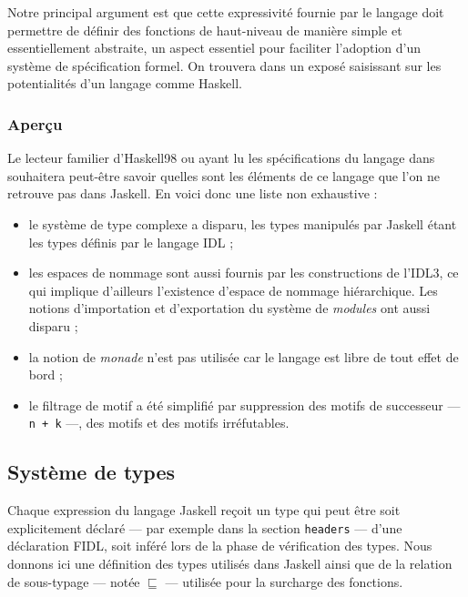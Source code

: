 Notre principal argument est que cette expressivit\'e fournie par le
langage doit permettre de d\'efinir des fonctions de haut-niveau de
mani\`ere simple et essentiellement abstraite, un aspect essentiel pour
faciliter l'adoption d'un syst\`eme de sp\'ecification formel. On trouvera
dans \cite{finfunc} un expos\'e saisissant sur les potentialit\'es d'un
langage comme \textsf{Haskell}.

\subsubsection{Aper\c{c}u}

Le lecteur familier d'\textsf{Haskell98} ou ayant lu les
sp\'ecifications du langage dans \cite{h98report} souhaitera peut-\^etre
savoir quelles sont les \'el\'ements de ce langage que l'on ne retrouve
pas dans \textsf{Jaskell}. En voici donc une liste non exhaustive :
\begin{itemize}
  \item le syst\`eme de type complexe a disparu, les types manipul\'es par
  \textsf{Jaskell} \'etant les types d\'efinis par le langage \textsf{IDL}
  ;
\item les espaces de nommage sont aussi fournis par les constructions
  de l'\textsf{IDL3}, ce qui implique d'ailleurs l'existence d'espace
  de nommage hi\'erarchique. Les notions d'importation et d'exportation
  du syst\`eme de \emph{modules} ont aussi disparu ;
\item la notion de \emph{monade} n'est pas utilis\'ee car le langage est
  libre de tout effet de bord ;
\item le filtrage de motif a \'et\'e simplifi\'e par suppression des motifs
  de successeur --- \texttt{n + k} ---, des motifs \texttt{\@} et des
  motifs irr\'efutables.
\end{itemize}

\subsection{Syst\`eme de types}

Chaque expression du langage \textsf{Jaskell} re\c{c}oit un type qui
peut \^etre soit explicitement d\'eclar\'e --- par exemple dans la
section \texttt{headers} --- d'une d\'eclaration \textsf{FIDL}, soit
inf\'er\'e lors de la phase de v\'erification des types. Nous
donnons ici une d\'efinition des types utilis\'es dans
\textsf{Jaskell} ainsi que de la relation de sous-typage ---
not\'ee $\sqsubseteq$ --- utilis\'ee pour la surcharge des
fonctions. 

